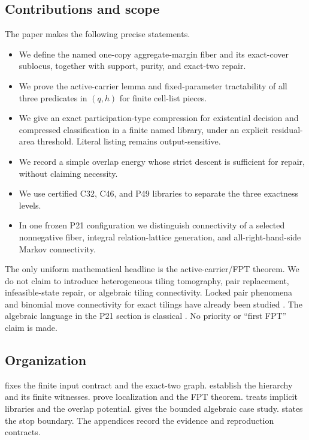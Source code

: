 \subsection{Contributions and scope}

The paper makes the following precise statements.

\begin{itemize}
  \item We define the named one-copy aggregate-margin fiber and its exact-cover
        sublocus, together with support, purity, and exact-two repair.
  \item We prove the active-carrier lemma and fixed-parameter tractability of
        all three predicates in \((q,h)\) for finite cell-list pieces.
  \item We give an exact participation-type compression for existential
        decision and compressed classification in a finite named library,
        under an explicit residual-area threshold.  Literal listing remains
        output-sensitive.
  \item We record a simple overlap energy whose strict descent is sufficient
        for repair, without claiming necessity.
  \item We use certified C32, C46, and P49 libraries to separate the three
        exactness levels.
  \item In one frozen P21 configuration we distinguish connectivity of a
        selected nonnegative fiber, integral relation-lattice generation, and
        all-right-hand-side Markov connectivity.
\end{itemize}

The only uniform mathematical headline is the active-carrier/FPT theorem.
We do not claim to introduce heterogeneous tiling tomography, pair
replacement, infeasible-state repair, or algebraic tiling connectivity.
Locked pair phenomena and binomial move connectivity for exact tilings have
already been studied \cite{TuckerFoltz2023,GrossYamzon2021}.  The algebraic
language in the P21 section is classical
\cite{DiaconisSturmfels1998,AokiTakemuraYoshida2008,
CharalambousThomaVladoiu2016}.  No priority or ``first FPT'' claim is made.

\subsection{Organization}

 fixes the finite input contract and the exact-two graph.
 establish the hierarchy and its finite
witnesses.   prove localization and the FPT
theorem.   treats implicit libraries and the overlap
potential.   gives the bounded algebraic case study.
 states the stop boundary.  The appendices record the
evidence and reproduction contracts.
